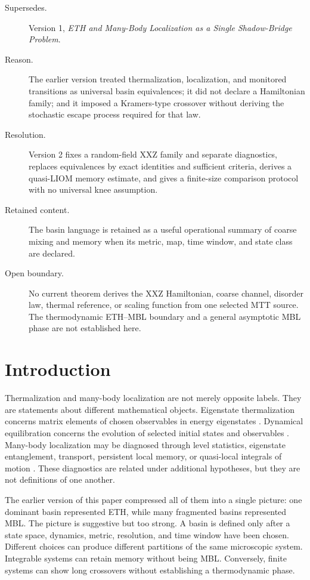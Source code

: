 \documentclass[11pt]{article}
\begin{document}
\begin{description}
\item[Supersedes.] Version 1, \emph{ETH and Many-Body Localization as a
Single Shadow-Bridge Problem}.
\item[Reason.] The earlier version treated thermalization, localization,
and monitored transitions as universal basin equivalences; it did not
declare a Hamiltonian family; and it imposed a Kramers-type crossover
without deriving the stochastic escape process required for that law.
\item[Resolution.] Version 2 fixes a random-field XXZ family and separate
diagnostics, replaces equivalences by exact identities and sufficient
criteria, derives a quasi-LIOM memory estimate, and gives a finite-size
comparison protocol with no universal knee assumption.
\item[Retained content.] The basin language is retained as a useful
operational summary of coarse mixing and memory when its metric, map,
time window, and state class are declared.
\item[Open boundary.] No current theorem derives the XXZ Hamiltonian,
coarse channel, disorder law, thermal reference, or scaling function from
one selected MTT source.  The thermodynamic ETH--MBL boundary and a
general asymptotic MBL phase are not established here.
\end{description}

\section{Introduction}

Thermalization and many-body localization are not merely opposite labels.
They are statements about different mathematical objects.  Eigenstate
thermalization concerns matrix elements of chosen observables in energy
eigenstates \cite{deutsch1991,srednicki1994}.  Dynamical equilibration
concerns the evolution of selected initial states and observables
\cite{reimann2008}.  Many-body localization may be diagnosed through
level statistics, eigenstate entanglement, transport, persistent local
memory, or quasi-local integrals of motion
\cite{oganesyan2007,pal2010,imbrie2016}.  These diagnostics are related
under additional hypotheses, but they are not definitions of one another.

The earlier version of this paper compressed all of them into a single
picture: one dominant basin represented ETH, while many fragmented basins
represented MBL.  The picture is suggestive but too strong.  A basin is
defined only after a state space, dynamics, metric, resolution, and time
window have been chosen.  Different choices can produce different
partitions of the same microscopic system.  Integrable systems can retain
memory without being MBL.  Conversely, finite systems can show long
crossovers without establishing a thermodynamic phase.
\end{document}
